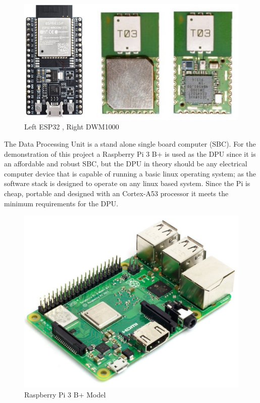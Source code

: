 \medskip
\begin{figure}[H]
\centering
    \includegraphics[scale=0.75]{./images/dwm_esp.png}
    \caption{Left ESP32 \cite{R2-1-1-2}, Right DWM1000}
    \label{dwm_esp}
\end{figure}

The Data Processing Unit is a stand alone single board computer (SBC). For the demonstration of this project a Raspberry Pi 3 B+ is used as the DPU since it is an affordable and robust SBC, but the DPU in theory should be any electrical computer device that is capable of running a basic linux operating system; as the software stack is designed to operate on any linux based system. Since the Pi is cheap, portable and designed with an Cortex-A53 processor it meets the minimum requirements for the DPU.

\medskip
\begin{figure}[H]
\centering
    \includegraphics[scale=1]{./images/pi.jpg}
    \caption{Raspberry Pi 3 B+ Model \cite{R2-1-1-3}}
    \label{pi}
\end{figure}



